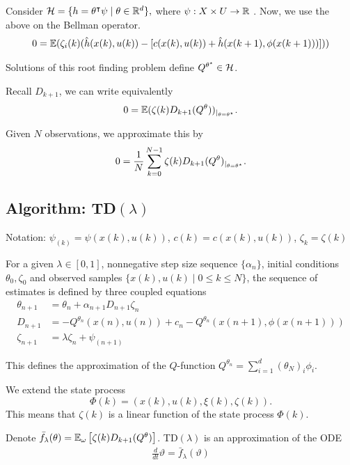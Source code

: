 Consider \(\mathcal{H}=\{h=\theta^\intercal \psi\mid \theta\in\mathbb{R}^d\},\) where \(\psi:X\times U\to \mathbb{R}\) .
Now, we use the above on the Bellman operator.
\begin{align*}
    0=\mathbb{E}(\zeta_i(k)(\hat{h}(x(k),u(k))-[c(x(k),u(k))+\hat{h}(x(k+1),\phi(x(k+1)))]))
\end{align*}

Solutions of this root finding problem define \(Q^{\theta^\star}\in \mathcal{H}\).

Recall \(D_{k+1}\), we can write equivalently
\begin{align*}
    0=\mathbb{E}(\zeta(k)D_{k+1}(Q^{\theta}))_{|_{\theta=\theta^\star}}.
\end{align*}

Given \(N\) observations, we approximate this by 
\[0=\frac{1}{N}\sum_{k=0}^{N-1}\zeta(k)D_{k+1}(Q^\theta)_{|_{\theta=\theta^\star}}.\]

\subsection{Algorithm: TD\((\lambda)\)}
Notation: \(\psi_{(k)}=\psi(x(k),u(k))\), \(c(k)=c(x(k),u(k))\), \(\zeta_k=\zeta(k)\)

For a given \(\lambda\in [0,1]\), nonnegative step size sequence \(\{\alpha_n\}\),
initial conditions \(\theta_0,\zeta_0\) and observed samples \(\{x(k),u(k)\mid 0\leq k\leq N\}\),
the sequence of estimates is defined by three coupled equations
\begin{align*}
    \theta_{n+1}&=\theta_n+\alpha_{n+1}D_{n+1}\zeta_n\\
    D_{n+1}     &= -Q^{\theta_n}(x(n),u(n))+c_n-Q^{\theta_n}(x(n+1),\phi(x(n+1)))\\
    \zeta_{n+1} &= \lambda \zeta_{n}+\psi_{(n+1)}
\end{align*}

This defines the approximation of the \(Q\)-function \(Q^{\theta_n}=\sum_{i=1}^d(\theta_N)_i\phi_i\).

We extend the state process 
\[\Phi(k)=(x(k),u(k),\xi(k),\zeta(k)).\]
This means that \(\zeta(k)\) is a linear function of the state process \(\Phi(k)\).

Denote \(\bar{f}_\lambda(\theta)=\mathbb{E}_\omega\left[\zeta(k)D_{k+1}(Q^\theta)\right]\). TD\((\lambda)\)
is an approximation of the ODE 
\begin{eqnarray}\label{eq:tdlambda_ode}
    \frac{d}{dt}\vartheta=\bar{f}_\lambda(\vartheta)
\end{eqnarray}

